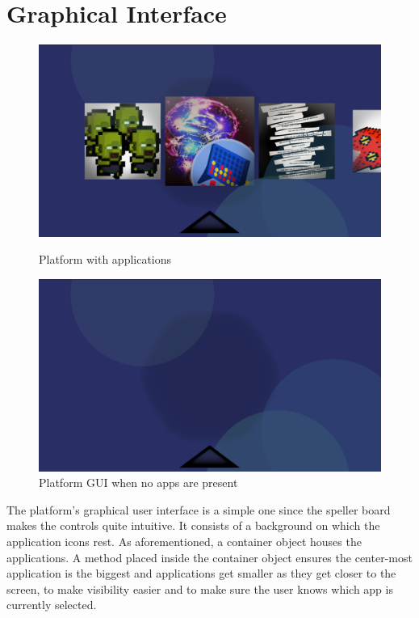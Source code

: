 \section{Graphical Interface} \label{sect:Platform GUI}
\begin{figure}[H]
    \begin{minipage}[c]{0.45\linewidth}
      \includegraphics[width=\linewidth]{Graphics/Platform GUI/Platform 2.png}
      \caption{Platform with applications}
      \end{minipage}
    \hfill
    \begin{minipage}[c]{0.45\linewidth}
      \includegraphics[width=\linewidth]{Graphics/Platform GUI/Platform Empty.png}
      \caption{Platform GUI when no apps are present}
  \end{minipage}%
\end{figure}


The platform's graphical user interface is a simple one since the speller board makes the controls quite intuitive. It consists of a background on which the application icons rest. As aforementioned, a container object houses the applications. A method placed inside the container object ensures the center-most application is the biggest and applications get smaller as they get closer to the screen, to make visibility easier and to make sure the user knows which app is currently selected.


